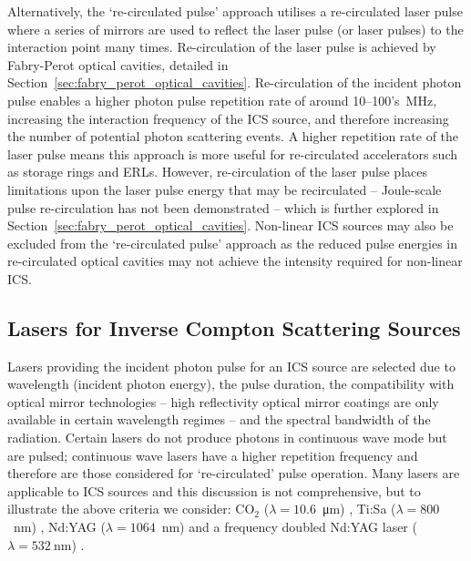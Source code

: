 \documentclass[../main.tex]{subfiles}
\begin{document}
Alternatively, the `re-circulated pulse' approach utilises a re-circulated laser pulse where a series of mirrors are used to reflect the laser pulse (or laser pulses) to the interaction point many times. Re-circulation of the laser pulse is achieved by Fabry-Perot optical cavities, detailed in Section~\ref{sec:fabry_perot_optical_cavities}. Re-circulation of the incident photon pulse enables a higher photon pulse repetition rate of around 10--100's~\si{\mega\hertz}, increasing the interaction frequency of the ICS source, and therefore increasing the number of potential photon scattering events. A higher repetition rate of the laser pulse means this approach is more useful for re-circulated accelerators such as storage rings and ERLs. However, re-circulation of the laser pulse places limitations upon the laser pulse energy that may be recirculated -- Joule-scale pulse re-circulation has not been demonstrated -- which is further explored in Section~\ref{sec:fabry_perot_optical_cavities}. Non-linear ICS sources may also be excluded from the `re-circulated pulse' approach as the reduced pulse energies in re-circulated optical cavities may not achieve the intensity required for non-linear ICS.     

\subsection{Lasers for Inverse Compton Scattering Sources}
\label{sec:ICS_lasers}

Lasers providing the incident photon pulse for an ICS source are selected due to wavelength (incident photon energy), the pulse duration, the compatibility with optical mirror technologies -- high reflectivity optical mirror coatings are only available in certain wavelength regimes -- and the spectral bandwidth of the radiation. Certain lasers do not produce photons in continuous wave mode but are pulsed; continuous wave lasers have a higher repetition frequency and therefore are those considered for `re-circulated' pulse operation. Many lasers are applicable to ICS sources and this discussion is not comprehensive, but to illustrate the above criteria we consider: CO$_{2}$ ($\lambda=10.6$~\si{\micro\meter}) \cite{ovodenko2016high}, Ti:Sa ($\lambda=800$~\si{\nano\meter}) \cite{thorlabs2021tisa}, Nd:YAG ($\lambda=1064$~\si{\nano\meter}) \cite{thorlabs2021ndyag450,thorlabs2021ndyag200} and a frequency doubled Nd:YAG laser ($\lambda=532~\si{\nano\meter}$) \cite{chauchat2010instrumentation}.
\end{document}

